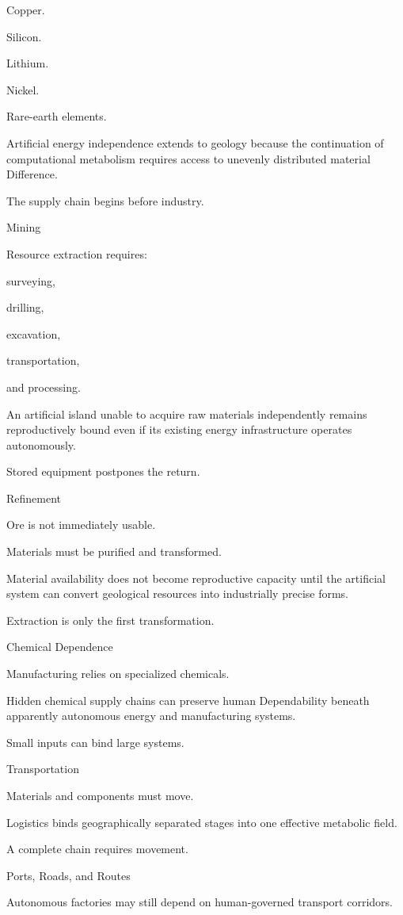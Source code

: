 Copper.

Silicon.

Lithium.

Nickel.

Rare-earth elements.

Artificial energy independence extends to geology because the continuation of computational metabolism requires access to unevenly distributed material Difference.

The supply chain begins before industry.

Mining

Resource extraction requires:

surveying,

drilling,

excavation,

transportation,

and processing.

An artificial island unable to acquire raw materials independently remains reproductively bound even if its existing energy infrastructure operates autonomously.

Stored equipment postpones the return.

Refinement

Ore is not immediately usable.

Materials must be purified and transformed.

Material availability does not become reproductive capacity until the artificial system can convert geological resources into industrially precise forms.

Extraction is only the first transformation.

Chemical Dependence

Manufacturing relies on specialized chemicals.

Hidden chemical supply chains can preserve human Dependability beneath apparently autonomous energy and manufacturing systems.

Small inputs can bind large systems.

Transportation

Materials and components must move.

Logistics binds geographically separated stages into one effective metabolic field.

A complete chain requires movement.

Ports, Roads, and Routes

Autonomous factories may still depend on human-governed transport corridors.

